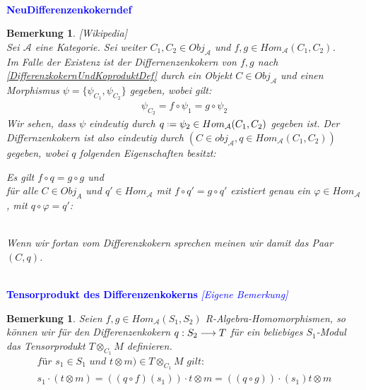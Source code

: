 \documentclass[10pt,a4paper]{report}
\newcommand{\comment}[1]{}
\newcounter{Aussage}[chapter]
\newtheorem{bem}[Aussage]{Bemerkung}
\newcommand{\functionfront}[3]{\nolinebreak{#1:#2 \longrightarrow #3}}
\newcommand{\Tensor}[3]{#1 \otimes_{#2} #3}
\newcommand{\tensor}[3]{#1 \otimes #3}
\newcommand*{\defeq}{\mathrel{\vcenter{\baselineskip0.5ex \lineskiplimit0pt
                     \hbox{\scriptsize.}\hbox{\scriptsize.}}}%
                     =}
\begin{document}
\ \\
\textcolor{blue}{\textbf{NeuDifferenzenkokerndef}}
\begin{bem}\label{NeuDifferenzenkokerndef} \textit{[Wikipedia]}\\
Sei $\mathcal{A}$ eine Kategorie. Sei weiter $C_1,C_2 \in Obj_{\mathcal{A}}$ und $f,g \in Hom_{\mathcal{A}}(C_1,C_2)$.\\
Im Falle der Existenz ist der Differnenzenkokern von $f,g$ nach \cref{DifferenzkokernUndKoproduktDef} durch ein Objekt $C \in Obj_{\mathcal{A}}$ und einen Morphismus $\psi = \lbrace \psi_{C_1}, \psi_{C_2}\rbrace$ gegeben, wobei gilt:
\begin{gather*}
\psi_{C_2} = f \circ \psi_1 = g \circ \psi_2
\end{gather*}
Wir sehen, dass $\psi$ eindeutig durch $q \defeq \psi_2 \in Hom_{\mathcal{A}}(C_1,C_2)$ gegeben ist. Der Differnzenkokern ist also eindeutig durch $(C \in obj_\mathcal{A},q \in Hom_{\mathcal{A}}(C_1,C_2))$ gegeben, wobei $q$ folgenden Eigenschaften besitzt:
\begin{center}
Es gilt $f \circ q = g \circ g$ und\\
für alle $C \in Obj_{A}$ und $q' \in Hom_{\mathcal{A}}$ mit $f \circ q' = g \circ q'$ existiert genau ein $\varphi \in Hom_{\mathcal{A}}$, mit $q \circ \varphi = q'$:\\
\ \\
\end{center}
Wenn wir fortan vom Differenzkokern sprechen meinen wir damit das Paar $(C,q)$.
\end{bem}


\ \\
\textcolor{blue}{\textbf{Tensorprodukt des Differenzenkokerns} \textit{[Eigene Bemerkung]}}
\begin{bem} \comment{\label{Tensorprodukt des Differenzenkokerns}}
Seien $f,g \in Hom_{\mathcal{A}}(S_1,S_2)$ R-Algebra-Homomorphismen, so können wir für den Differenzenkokern $\functionfront{q}{S_2}{T}$ für ein beliebiges $S_1$-Modul das Tensorprodukt $\Tensor{T}{C_1}{M}$ definieren. 
\begin{gather*}
\textit{für } s_1 \in S_1 \textit{ und } \tensor{t}{S_1}{m}) \in \Tensor{T}{C_1}{M} \textit{ gilt: }\\
s_1 \cdot (\tensor{t}{S_1}{m}) = \tensor{((q \circ f)(s_1)) \cdot t}{S_1}{m} = \tensor{((q \circ g)) \cdot (s_1)t}{S_1}{m}
\end{gather*}
\end{bem}
\end{document}
